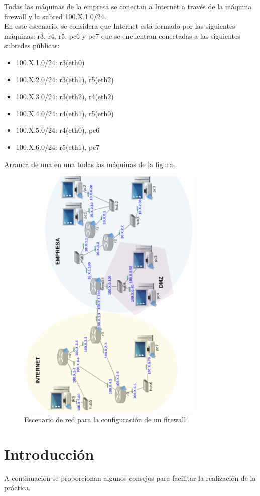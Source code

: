 \documentclass[12pt, a4paper]{report}
\begin{document}
Todas las máquinas de la empresa se conectan a Internet a través de la máquina firewall y la
subred 100.X.1.0/24.\\

En este escenario, se considera que Internet está formado por las siguientes máquinas: r3, r4, r5,
pc6 y pc7 que se encuentran conectadas a las siguientes subredes públicas:
\begin{itemize}
	\item 100.X.1.0/24: r3(eth0)
	\item 100.X.2.0/24: r3(eth1), r5(eth2)
	\item 100.X.3.0/24: r3(eth2), r4(eth2)
	\item 100.X.4.0/24: r4(eth1), r5(eth0)
	\item 100.X.5.0/24: r4(eth0), pc6
	\item 100.X.6.0/24: r5(eth1), pc7
\end{itemize}
Arranca de una en una todas las máquinas de la figura.
\begin{figure}[h]
	\centering
	\includegraphics[width=0.8\textwidth,rotate=-90]{enunciado1}
	\caption{Escenario de red para la configuración de un firewall}
\end{figure}
\chapter{Introducción}
A continuación se proporcionan algunos consejos para facilitar la realización de la práctica.
\end{document}
